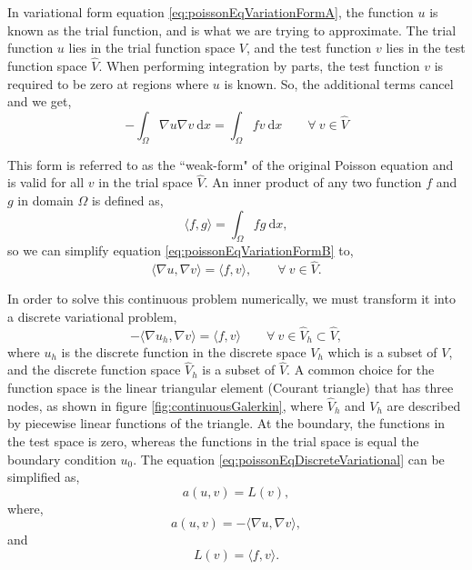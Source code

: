 In variational form equation \ref{eq:poissonEqVariationFormA}, the function $u$ is known as the trial function, and is what we are trying to approximate. The trial function $u$ lies in the trial function space $V$, and the test function $v$ lies in the test function space $\hat{V}$. When performing integration by parts, the test function $v$ is required to be zero at regions where $u$ is known. So, the additional terms cancel and we get,
	\begin{equation}
	- \int_{\Omega} \nabla u \nabla v\ \mathrm{d}x= \int_{\Omega} fv\ \mathrm{d}x \qquad \forall\ v \in \hat{V}
	\label{eq:poissonEqVariationFormB}
	\end{equation}

This form is referred to as the ``weak-form" of the original Poisson equation and is valid for all $v$ in the trial space $\hat{V}$. An inner product of any two function $f$ and $g$ in domain $\Omega$ is defined as,
	\begin{equation}
	\langle f,g \rangle = \int_{\Omega}fg\ \mathrm{d}x,
	\end{equation}
so we can simplify equation \ref{eq:poissonEqVariationFormB} to,
	\begin{equation}
	\langle \nabla u,\nabla v \rangle = \langle f,v \rangle, \qquad \forall\ v \in \hat{V}.
	\end{equation}

In order to solve this continuous problem numerically, we must transform it into a discrete variational problem,
	\begin{equation}
	-\langle \nabla u_h, \nabla v \rangle = \langle f, v \rangle \qquad \forall\ v \in \hat{V}_h \subset \hat{V},
	\label{eq:poissonEqDiscreteVariational}
	\end{equation}
where $u_h$ is the discrete function in the discrete space $V_h$ which is a subset of $V$, and the discrete function space $\hat{V}_h$ is a subset of $\hat{V}$. A common choice for the function space is the linear triangular element (Courant triangle) that has three nodes, as shown in figure \ref{fig:continuousGalerkin}, where $\hat{V}_h$ and $V_h$ are described by piecewise linear functions of the triangle. At the boundary, the functions in the test space is zero, whereas the functions in the trial space is equal the boundary condition $u_0$.  The equation \ref{eq:poissonEqDiscreteVariational} can be simplified as,
	\begin{equation}
	a\left(u,v\right) = L(v),
	\label{eq:weakForm}
	\end{equation}
where,
	\begin{equation}
	a\left(u,v\right) = - \langle \nabla u, \nabla v \rangle,
	\end{equation}
and
	\begin{equation}
	L(v) = \langle f,v \rangle.
	\end{equation}

